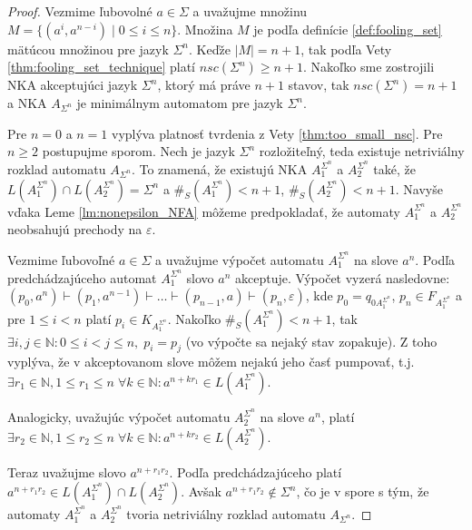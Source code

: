 \begin{proof}
Vezmime ľubovolné $ a \in \Sigma $ a uvažujme množinu $ M = \lbrace (a^i,a^{n-i}) \; | \; 0 \leq i \leq n \rbrace $. Množina $ M $ je podľa definície \ref{def:fooling_set} mätúcou množinou pre jazyk $ \Sigma^n $. Keďže $ |M| = n+1 $, tak podľa Vety \ref{thm:fooling_set_technique} platí $ nsc(\Sigma^n) \geq n+1 $. Nakoľko sme zostrojili NKA akceptujúci jazyk $ \Sigma^n $, ktorý má práve $ n+1 $ stavov, tak $ nsc(\Sigma^n) = n+1 $ a NKA $ A_{\Sigma^n} $ je minimálnym automatom pre jazyk $ \Sigma^n $.
\par
Pre $ n=0 $ a $ n=1 $ vyplýva platnosť tvrdenia z Vety \ref{thm:too_small_nsc}. Pre $ n \geq 2 $ postupujme sporom. Nech je jazyk $ \Sigma^n$ rozložiteľný, teda existuje netriviálny rozklad automatu $ A_{\Sigma^n} $. To znamená, že existujú NKA $ A_1^{\Sigma^n} $ a $ A_2^{\Sigma^n} $ také, že $ L(A_1^{\Sigma^n}) \cap L(A_2^{\Sigma^n}) = \Sigma^n $ a $ \#_S(A_1^{\Sigma^n}) < n+1 $, $ \#_S(A_2^{\Sigma^n}) < n+1 $. Navyše vďaka Leme \ref{lm:nonepsilon_NFA} môžeme predpokladať, že automaty $ A_1^{\Sigma^n} $ a $ A_2^{\Sigma^n} $ neobsahujú prechody na $ \varepsilon $. 
\par
Vezmime ľubovoľné $ a \in \Sigma $ a uvažujme výpočet automatu $ A_1^{\Sigma^n} $ na slove $ a^n $. Podľa predchádzajúceho automat $ A_1^{\Sigma^n} $ slovo $ a^n $ akceptuje. Výpočet vyzerá nasledovne: $ (p_0,a^n) \vdash (p_1, a^{n-1}) \vdash \ldots \vdash (p_{n-1}, a) \vdash (p_n, \varepsilon) $, kde $ p_0 = q_{0A_1^{\Sigma^n}}$, $ p_n \in F_{A_1^{\Sigma^n}} $ a pre $ 1 \leq i < n $ platí $ p_i \in K_{A_1^{\Sigma^n}}$. Nakoľko $ \#_S(A_1^{\Sigma^n}) < n+1 $, tak $ \exists i,j \in \mathbb{N} : 0 \leq i < j \leq n, \; p_i=p_j $ (vo výpočte sa nejaký stav zopakuje). Z toho vyplýva, že v akceptovanom slove môžem nejakú jeho časť pumpovať, t.j. $ \exists r_1 \in \mathbb{N}, 1 \leq r_1 \leq n \; \forall k \in \mathbb{N}: a^{n + kr_1} \in L(A_1^{\Sigma^n}) $.
\par
Analogicky, uvažujúc výpočet automatu $ A_2^{\Sigma^n} $ na slove $ a^n $, platí $ \exists r_2 \in \mathbb{N}, 1 \leq r_2 \leq n \; \forall k \in \mathbb{N}: a^{n + kr_2} \in L(A_2^{\Sigma^n}) $.
\par
Teraz uvažujme slovo $ a^{n+r_1r_2} $. Podľa predchádzajúceho platí $ a^{n+r_1r_2} \in L(A_1^{\Sigma^n}) \cap L(A_2^{\Sigma^n}) $. Avšak $ a^{n+r_1r_2} \notin \Sigma^n $, čo je v spore s tým, že automaty $ A_1^{\Sigma^n} $ a $ A_2^{\Sigma^n} $ tvoria netriviálny rozklad automatu $ A_{\Sigma^n} $.
\end{proof}

